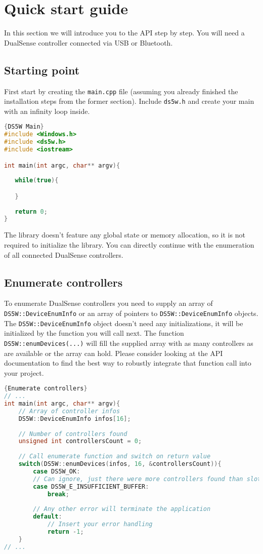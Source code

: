 \section{Quick start guide}
In this section we will introduce you to the API step by step. You will need a DualSense controller connected via USB or Bluetooth.

\subsection{Starting point}
First start by creating the \texttt{main.cpp} file (assuming you already finished the installation steps from the former section). Include \texttt{ds5w.h} and create your main with an infinity loop inside.
\begin{lstlisting}[language=C++,label=code0,caption={DS5W Main}]{DS5W Main}
#include <Windows.h>
#include <ds5w.h>
#include <iostream>

int main(int argc, char** argv){
   
   while(true){

   }
   
   return 0;
}
\end{lstlisting}
The library doesn't feature any global state or memory allocation, so it is not required to initialize the library. You can directly continue with the enumeration of all connected DualSense controllers.

\subsection{Enumerate controllers}
To enumerate DualSense controllers you need to supply an array of \texttt{DS5W::DeviceEnumInfo} or an array of pointers to \texttt{DS5W::DeviceEnumInfo} objects. The \texttt{DS5W::DeviceEnumInfo} object doesn't need any initializations, it will be initialized by the function you will call next. The function \texttt{DS5W::enumDevices(...)} will fill the supplied array with as many controllers as are available or the array can hold. Please consider looking at the API documentation to find the best way to robustly integrate that function call into your project.\\

\begin{minipage}{\textwidth}
\begin{lstlisting}[language=C++,label=code1,caption={Enumerate controllers}]{Enumerate controllers}
// ...
int main(int argc, char** argv){
	// Array of controller infos
	DS5W::DeviceEnumInfo infos[16];
	
	// Number of controllers found
	unsigned int controllersCount = 0;
	
	// Call enumerate function and switch on return value
	switch(DS5W::enumDevices(infos, 16, &controllersCount)){
		case DS5W_OK:
		// Can ignore, just there were more controllers found than slots in the buffer
		case DS5W_E_INSUFFICIENT_BUFFER:
			break;
			
		// Any other error will terminate the application
		default:
			// Insert your error handling
			return -1;
	}
// ...
\end{lstlisting}
\end{minipage}

